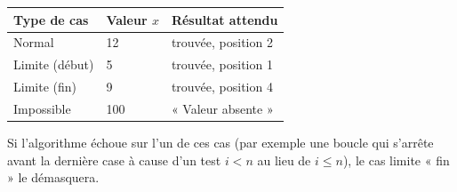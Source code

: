 \documentclass[11pt]{article}
\begin{document}
\begin{exemplebox}[{Jeux de tests pour la recherche séquentielle sur $T = [5, 12, 17, 9]$}]
\begin{center}
\begin{tabularx}{\linewidth}{|l|l|X|}
\hline
\rowcolor{popblueL} \textbf{Type de cas} & \textbf{Valeur $x$} & \textbf{Résultat attendu} \\
\hline
Normal & 12 & trouvée, position 2 \\
\hline
Limite (début) & 5 & trouvée, position 1 \\
\hline
Limite (fin) & 9 & trouvée, position 4 \\
\hline
Impossible & 100 & « Valeur absente » \\
\hline
\end{tabularx}
\end{center}
Si l'algorithme échoue sur l'un de ces cas (par exemple une boucle qui s'arrête avant la dernière case à cause d'un test $i < n$ au lieu de $i \le n$), le cas limite « fin » le démasquera.
\end{exemplebox}
\end{document}

